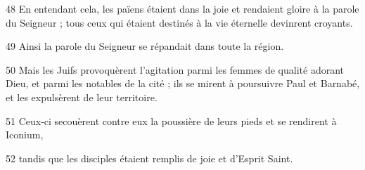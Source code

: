 
48 En entendant cela, les païens étaient dans la joie et rendaient gloire à la parole du Seigneur ; tous ceux qui étaient destinés à la vie éternelle devinrent croyants.

49 Ainsi la parole du Seigneur se répandait dans toute la région.

50 Mais les Juifs provoquèrent l’agitation parmi les femmes de qualité adorant Dieu, et parmi les notables de la cité ; ils se mirent à poursuivre Paul et Barnabé, et les expulsèrent de leur territoire.

51 Ceux-ci secouèrent contre eux la poussière de leurs pieds et se rendirent à Iconium,

52 tandis que les disciples étaient remplis de joie et d’Esprit Saint.